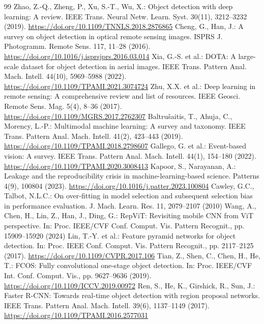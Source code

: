 \sloppy
\begin{thebibliography}{99}
 Zhao, Z.-Q., Zheng, P., Xu, S.-T., Wu, X.: Object detection with deep learning: A review. IEEE Trans. Neural Netw. Learn. Syst. 30(11), 3212--3232 (2019). \url{https://doi.org/10.1109/TNNLS.2018.2876865}
 Cheng, G., Han, J.: A survey on object detection in optical remote sensing images. ISPRS J. Photogramm. Remote Sens. 117, 11--28 (2016). \url{https://doi.org/10.1016/j.isprsjprs.2016.03.014}
 Xia, G.-S. et al.: DOTA: A large-scale dataset for object detection in aerial images. IEEE Trans. Pattern Anal. Mach. Intell. 44(10), 5969--5988 (2022). \url{https://doi.org/10.1109/TPAMI.2021.3074724}
 Zhu, X.X. et al.: Deep learning in remote sensing: A comprehensive review and list of resources. IEEE Geosci. Remote Sens. Mag. 5(4), 8--36 (2017). \url{https://doi.org/10.1109/MGRS.2017.2762307}
 Baltru\v{s}aitis, T., Ahuja, C., Morency, L.-P.: Multimodal machine learning: A survey and taxonomy. IEEE Trans. Pattern Anal. Mach. Intell. 41(2), 423--443 (2019). \url{https://doi.org/10.1109/TPAMI.2018.2798607}
 Gallego, G. et al.: Event-based vision: A survey. IEEE Trans. Pattern Anal. Mach. Intell. 44(1), 154--180 (2022). \url{https://doi.org/10.1109/TPAMI.2020.3008413}
 Kapoor, S., Narayanan, A.: Leakage and the reproducibility crisis in machine-learning-based science. Patterns 4(9), 100804 (2023). \url{https://doi.org/10.1016/j.patter.2023.100804}
 Cawley, G.C., Talbot, N.L.C.: On over-fitting in model selection and subsequent selection bias in performance evaluation. J. Mach. Learn. Res. 11, 2079--2107 (2010)
 Wang, A., Chen, H., Lin, Z., Han, J., Ding, G.: RepViT: Revisiting mobile CNN from ViT perspective. In: Proc. IEEE/CVF Conf. Comput. Vis. Pattern Recognit., pp. 15909--15920 (2024)
 Lin, T.-Y. et al.: Feature pyramid networks for object detection. In: Proc. IEEE Conf. Comput. Vis. Pattern Recognit., pp. 2117--2125 (2017). \url{https://doi.org/10.1109/CVPR.2017.106}
 Tian, Z., Shen, C., Chen, H., He, T.: FCOS: Fully convolutional one-stage object detection. In: Proc. IEEE/CVF Int. Conf. Comput. Vis., pp. 9627--9636 (2019). \url{https://doi.org/10.1109/ICCV.2019.00972}
 Ren, S., He, K., Girshick, R., Sun, J.: Faster R-CNN: Towards real-time object detection with region proposal networks. IEEE Trans. Pattern Anal. Mach. Intell. 39(6), 1137--1149 (2017). \url{https://doi.org/10.1109/TPAMI.2016.2577031}

\end{thebibliography}
